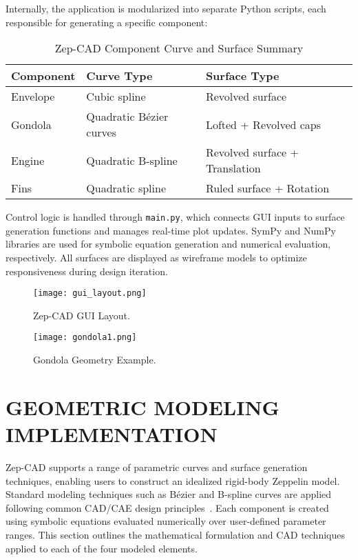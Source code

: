\documentclass[10pt]{article}
\begin{document}
Internally, the application is modularized into separate Python scripts, each responsible for generating a 
specific component:
\begin{table}[h!]
    \centering
    \caption{Zep-CAD Component Curve and Surface Summary}
    \begin{tabular}{|l|l|l|}
    \hline
    \textbf{Component} & \textbf{Curve Type} & \textbf{Surface Type} \\
    \hline
    Envelope & Cubic spline & Revolved surface \\
    Gondola & Quadratic Bézier curves & Lofted + Revolved caps \\
    Engine & Quadratic B-spline & Revolved surface + Translation \\
    Fins & Quadratic spline & Ruled surface + Rotation \\
    \hline
    \end{tabular}
\end{table}


Control logic is handled through \texttt{main.py}, which connects GUI inputs to surface generation functions and manages real-time plot updates. SymPy and NumPy libraries are used for symbolic equation generation and numerical evaluation, respectively. All surfaces are displayed as wireframe models to optimize responsiveness during design iteration.

\begin{figure}[h!]
    \centering
    \begin{minipage}{0.45\textwidth}
        \centering
        \texttt{[image: gui\_layout.png]} %
        \caption{Zep-CAD GUI Layout.}
    \end{minipage}%
    \hfill
    \begin{minipage}{0.45\textwidth}
        \centering
        \texttt{[image: gondola1.png]} %
        \caption{Gondola Geometry Example.}
    \end{minipage}
\end{figure}





\section{GEOMETRIC MODELING IMPLEMENTATION}

Zep-CAD supports a range of parametric curves and surface generation techniques, enabling users to construct an 
idealized rigid-body Zeppelin model. Standard modeling techniques such as Bézier and B-spline curves are applied 
following common CAD/CAE design principles~\cite{farin2002, piegl1997}. Each component is created using symbolic
equations evaluated numerically over user-defined parameter ranges. This section outlines the mathematical 
formulation and CAD techniques applied to each of the four modeled elements.
\end{document}
